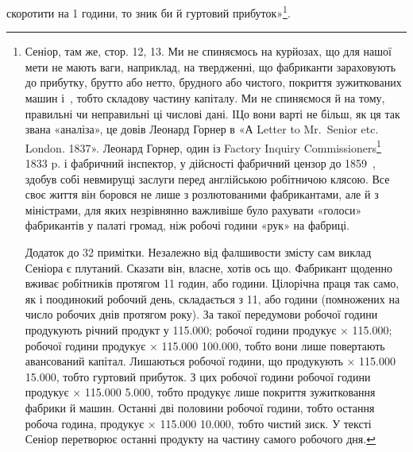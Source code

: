 скоротити на 1 години, то зник би й гуртовий прибуток»\footnote{
Сеніор, там же, стор. 12, 13. Ми не спиняємось на курйозах, що для нашої мети не мають ваги,
наприклад, на твердженні, що фабриканти зараховують до прибутку, брутто або нетто, брудного або
чистого, покриття зужиткованих машин і~, тобто складову частину капіталу. Ми не
спиняємося й на тому, правильні чи неправильні ці числові дані. ІЦо вони
варті не більш, як ця так звана «аналіза», це довів Леонард Горнер в «А Letter to Mr.~Senior etc.
London. 1837». Леонард Горнер, один із Factory Inquiry Commissioners\footnote*{
— членів комісії для розсліду відносин по фабриках. \emph{Ред.}
} 1833 p. і фабричний
інспектор, у дійсності
фабричний цензор до 1859~, здобув собі невмирущі заслуги перед англійською робітничою клясою. Все
своє життя він боровся не лише з розлютованими фабрикантами, але й з міністрами, для яких
незрівнянно важливіше було рахувати «голоси» фабрикантів у палаті громад, ніж
робочі години «рук» на фабриці.

Додаток до 32 примітки. Незалежно від фалшивости змісту сам виклад Сеніора є плутаний. Сказати він,
власне, хотів ось що. Фабрикант щоденно вживає робітників протягом 11 годин, або  години.
Цілорічна праця так само, як і поодинокий робочий день, складається з 11,
або  години (помножених на число робочих днів протягом року). За такої передумови  робочої
години продукують річний продукт у \num{115.000};  робочої години продукує  ×
\num{115.000};  робочої години продукує  × \num{115.000} \deq{} \num{100.000}, тобто вони лише повертають
авансований капітал. Лишаються  робочої години, що продукують  × \num{115.000} \deq{}
\num{15.000}, тобто гуртовий прибуток. З цих  робочої години  робочої години
продукує  × \num{115.000} \deq{} \num{5.000}, тобто продукує
лише покриття зужитковання фабрики й машин. Останні дві половини робочої години, тобто остання
робоча година, продукує  × \num{115.000} \deq{} \num{10.000}, тобто чистий
зиск.
У тексті Сеніор перетворює останні  продукту на частину самого робочого
дня.
}.

